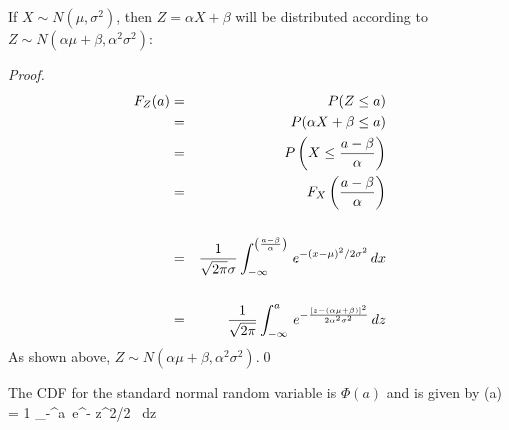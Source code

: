 If $X \sim N(\mu, \sigma^2)$, then $Z = \alpha X + \beta$ will be distributed according to $Z \sim N(\alpha\mu + \beta, \alpha^2\sigma^2)$: 
\begin{proof}
\begin{eqnarray*}\large
F_Z(a)    &=& P(Z\le a)\\
               &=& P(\alpha X + \beta \le a) \\
               &=& P\left(X \le {a - \beta\over \alpha}\right) \\
               &=& F_X\left({a - \beta\over \alpha}\right) \\ \\
               &=& {1\over \sqrt{2\pi}\sigma} \int_{-\infty}^{\left({a-\beta\over \alpha}\right)} \, e^{-(x-\mu)^2/2\sigma^2}\, dx\\ \\
               &=& {1\over \sqrt{2\pi}} \int_{-\infty}^{a}\, e^{-{ [z - (\alpha\mu + \beta) ]^2\over2\alpha^2\sigma^2} } \, dz
\end{eqnarray*}
As shown above, $Z \sim N(\alpha\mu + \beta, \alpha^2\sigma^2)$.\qed
\end{proof}

The CDF for the standard normal random variable is $\Phi(a)$ and is given by 
\be \Phi(a) = {1\over \sqrt{2\pi}} \int_{-\infty}^{a}\, e^{-{ z^2/2} } \, dz \label{eqn:Phi}\ee